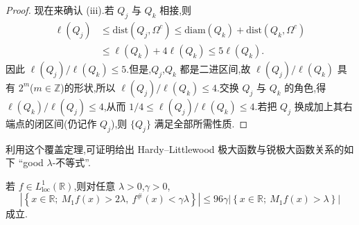 \begin{proof}
现在来确认 (iii).若 $Q_{j}$ 与 $Q_{k}$ 相接,则
\begin{equation*}
\begin{aligned}
\ell(Q_{j}) &\leq \mathrm{dist}(Q_{j}, \Omega^{c}) \leq \mathrm{diam}(Q_{k}) + \mathrm{dist}(Q_{k}, \Omega^{c}) \\
&\leq \ell(Q_{k}) + 4\ell(Q_{k}) \leq 5\ell(Q_{k}).
\end{aligned}
\end{equation*}
因此 $\ell(Q_{j})/\ell(Q_{k}) \leq 5$.但是,$Q_{j}$,$Q_{k}$ 都是二进区间,故 $\ell(Q_{j})/\ell(Q_{k})$ 具有 $2^{m}$($m \in \mathbb{Z}$)的形状,所以 $\ell(Q_{j})/\ell(Q_{k}) \leq 4$.交换 $Q_{j}$ 与 $Q_{k}$ 的角色,得 $\ell(Q_{k})/\ell(Q_{j}) \leq 4$,从而 $1/4 \leq \ell(Q_{j})/\ell(Q_{k}) \leq 4$.若把 $Q_{j}$ 换成加上其右端点的闭区间(仍记作 $Q_{j}$),则 $\{Q_{j}\}$ 满足全部所需性质.
\end{proof}

利用这个覆盖定理,可证明给出 Hardy--Littlewood 极大函数与锐极大函数关系的如下 ``good $\lambda$-不等式''.

\begin{lemma}\label{lem:1.6.5}
若 $f \in L_{\mathrm{loc}}^{1}(\mathbb{R})$,则对任意 $\lambda > 0$,$\gamma > 0$,
\begin{equation*}
\left|\left\{x \in \mathbb{R};\ M_{1}f(x) > 2\lambda,\ f^{\#}(x) < \gamma\lambda\right\}\right| \leq 96\gamma\left|\left\{x \in \mathbb{R};\ M_{1}f(x) > \lambda\right\}\right|
\end{equation*}
成立.
\end{lemma}

